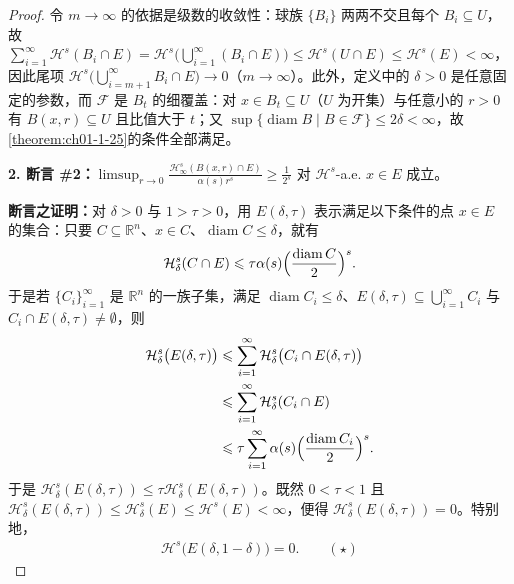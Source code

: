 \documentclass[../../main.tex]{subfiles}%
\begin{document}
\begin{proof}
令 $m\to\infty$ 的依据是级数的收敛性：球族 $\{B_i\}$ 两两不交且每个 $B_i\subseteq U$，故 $\sum_{i=1}^{\infty}\mathcal{H}^s(B_i\cap E)=\mathcal{H}^s\bigl(\bigcup_{i=1}^{\infty}(B_i\cap E)\bigr)\leqslant\mathcal{H}^s(U\cap E)\leqslant\mathcal{H}^s(E)<\infty$，因此尾项 $\mathcal{H}^s\bigl(\bigcup_{i=m+1}^{\infty}B_i\cap E\bigr)\to0$（$m\to\infty$）。此外，定义中的 $\delta>0$ 是任意固定的参数，而 $\mathcal{F}$ 是 $B_t$ 的细覆盖：对 $x\in B_t\subseteq U$（$U$ 为开集）与任意小的 $r>0$ 有 $B(x,r)\subseteq U$ 且比值大于 $t$；又 $\sup\{\operatorname{diam}B\mid B\in\mathcal{F}\}\leqslant2\delta<\infty$，故\cref{theorem:ch01-1-25}的条件全部满足。%

\textbf{2. 断言 \#2：}$\limsup_{r\to0}\frac{\mathcal{H}^s_\infty(B(x,r)\cap E)}{\alpha(s)r^s}\geqslant\frac{1}{2^s}$ 对 $\mathcal{H}^s$-a.e. $x\in E$ 成立。

\textbf{断言之证明：}对 $\delta>0$ 与 $1>\tau>0$，用 $E(\delta,\tau)$ 表示满足以下条件的点 $x\in E$ 的集合：只要 $C\subseteq\mathbb{R}^n$、$x\in C$、$\operatorname{diam}C\leqslant\delta$，就有
\begin{align*}
\mathcal{H}^s_\delta(C\cap E)\leqslant\tau\alpha(s)\Bigl(\frac{\operatorname{diam}C}{2}\Bigr)^s .
\end{align*}
于是若 $\{C_i\}_{i=1}^{\infty}$ 是 $\mathbb{R}^n$ 的一族子集，满足 $\operatorname{diam}C_i\leqslant\delta$、$E(\delta,\tau)\subseteq\bigcup_{i=1}^{\infty}C_i$ 与 $C_i\cap E(\delta,\tau)\neq\emptyset$，则
\begin{align*}
\mathcal{H}^s_\delta\bigl(E(\delta,\tau)\bigr)
&\leqslant\sum_{i=1}^{\infty}\mathcal{H}^s_\delta\bigl(C_i\cap E(\delta,\tau)\bigr)\\
&\leqslant\sum_{i=1}^{\infty}\mathcal{H}^s_\delta(C_i\cap E)\\
&\leqslant\tau\sum_{i=1}^{\infty}\alpha(s)\Bigl(\frac{\operatorname{diam}C_i}{2}\Bigr)^s .
\end{align*}
于是 $\mathcal{H}^s_\delta(E(\delta,\tau))\leqslant\tau\mathcal{H}^s_\delta(E(\delta,\tau))$。既然 $0<\tau<1$ 且 $\mathcal{H}^s_\delta(E(\delta,\tau))\leqslant\mathcal{H}^s_\delta(E)\leqslant\mathcal{H}^s(E)<\infty$，便得 $\mathcal{H}^s_\delta(E(\delta,\tau))=0$。特别地，
\begin{align*}
\mathcal{H}^s\bigl(E(\delta,1-\delta)\bigr)=0 . \qquad(\star)
\end{align*}


\end{proof}
\end{document}
